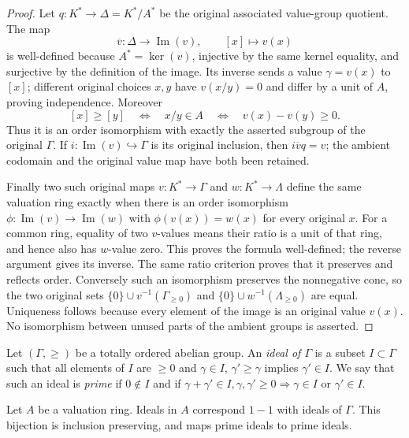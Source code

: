 \begin{proof}
Let $q:K^*\to\Delta=K^*/A^*$
be the original associated
value-group quotient. The map
$$
\overline v:\Delta\longrightarrow\operatorname{Im}(v),
\qquad[x]\longmapsto v(x)
$$
is well-defined because
$A^*=\ker(v)$, injective
by the same kernel equality,
and surjective by the
definition of the image.
Its inverse sends a value
$\gamma=v(x)$ to $[x]$;
different original choices
$x,y$ have $v(x/y)=0$
and differ by a unit of
$A$, proving independence.
Moreover
$$
[x]\geq[y]\quad\Longleftrightarrow\quad
x/y\in A\quad\Longleftrightarrow\quad
v(x)-v(y)\geq0.
$$
Thus it is an order
isomorphism with exactly
the asserted subgroup of
the original $\Gamma$.
If $i:\operatorname{Im}(v)\hookrightarrow\Gamma$
is its original inclusion,
then $i\overline vq=v$;
the ambient codomain and
the original value map
have both been retained.

Finally two such original
maps $v:K^*\to\Gamma$ and
$w:K^*\to\Lambda$ define
the same valuation ring
exactly when there is an
order isomorphism
$\phi:\operatorname{Im}(v)\to\operatorname{Im}(w)$
with $\phi(v(x))=w(x)$
for every original $x$.
For a common ring, equality
of two $v$-values means
their ratio is a unit
of that ring, and hence
also has $w$-value zero.
This proves the formula
well-defined; the reverse
argument gives its inverse.
The same ratio criterion
proves that it preserves
and reflects order. Conversely
such an isomorphism preserves
the nonnegative cone, so
the two original sets
$\{0\}\cup v^{-1}(\Gamma_{\geq0})$
and $\{0\}\cup w^{-1}(\Lambda_{\geq0})$
are equal. Uniqueness follows
because every element of
the image is an original
value $v(x)$. No isomorphism
between unused parts of the
ambient groups is asserted.
\end{proof}

\noindent
Let $(\Gamma, \geq)$ be a totally ordered abelian group.
An {\it ideal of $\Gamma$} is a subset $I \subset \Gamma$ such
that all elements of $I$ are $\geq 0$ and $\gamma \in I$,
$\gamma' \geq \gamma$ implies $\gamma' \in I$. We say that such
an ideal is {\it prime} if $0 \not \in I$ and if
$\gamma + \gamma' \in I, \gamma, \gamma' \geq 0
\Rightarrow \gamma \in I \text{ or } \gamma' \in I$.

\begin{lemma}
\label{editorial-source-lemma-ideals-valuation-ring}
Let $A$ be a valuation ring.
Ideals in $A$ correspond $1 - 1$ with ideals of $\Gamma$.
This bijection is inclusion preserving, and maps prime
ideals to prime ideals.
\end{lemma}

